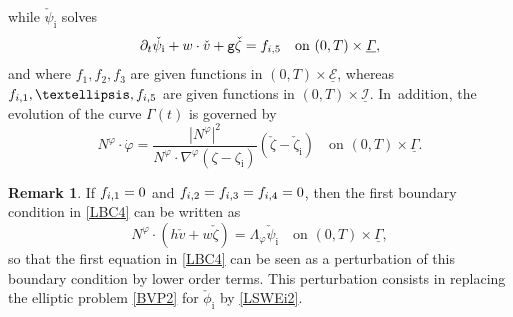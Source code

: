 \documentclass[11pt]{article}
\newcommand{\gr}{{\mathtt g}}
\newcommand{\dt}{\partial_t}
\newcommand{\cI}{{\mathcal I}}
\newcommand{\cE}{{\mathcal E}}
\newcommand{\ul}[1]{\underline{#1}}
\newcommand{\itGamma}{\mathit{\Gamma}}
\theoremstyle{definition}
\newtheorem{remark}[theorem]{Remark}
\begin{document}
while $\check{\psi}_\mathrm{i}$ solves
\begin{equation}\label{LBC4bis}
\dt\check{\psi}_\mathrm{i}+w\cdot\check{v}+\gr\check{\zeta}=f_{{\rm i},5} \quad \text{on } (0,T)\times\ul{\itGamma},
\end{equation}
and where $f_1,f_2,f_3$ are given functions in $(0,T)\times\ul{\cE}$, whereas $f_{{\rm i},1},\ldots,f_{{\rm i},5}$ are given functions in $(0,T)\times\ul{\cI}$. In~addition, the evolution of the curve $\itGamma(t)$ is governed by
\begin{equation}\label{EqPhibis}
N^\varphi\cdot\dot{\varphi} = \frac{|N^\varphi|^2}{N^\varphi\cdot\nabla^\varphi(\zeta-\zeta_\mathrm{i})}(\check{\zeta} -\check{\zeta}_\mathrm{i})
\quad\text{on } (0,T)\times\ul{\itGamma}.
\end{equation}

\begin{remark}
If $f_{{\rm i},1}=0$ and $f_{{\rm i},2}=f_{{\rm i},3}=f_{{\rm i},4}=0$, then the first boundary condition in \eqref{LBC4} can be written as
\[
N^\varphi\cdot(h\check{v}+w\check{\zeta}) = \Lambda_\varphi \check{\psi}_\mathrm{i}\quad \text{on } (0,T)\times \ul{\itGamma},
\]
so that the first equation in \eqref{LBC4} can be seen as a perturbation of this boundary condition by lower order terms.
This perturbation consists in replacing the elliptic problem \eqref{BVP2} for $\check{\phi}_\mathrm{i}$ by \eqref{LSWEi2}.
\end{remark}
\end{document}
